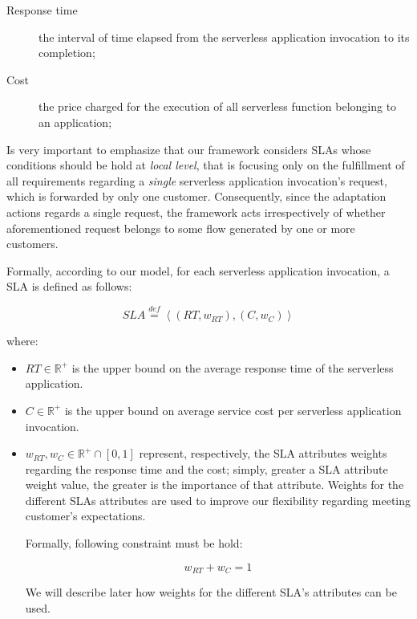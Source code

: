 \documentclass[12pt,a4paper]{report}
\newcommand{\mathDef}{\overset{\textit{def}}{=}}
\newcommand{\Rplus}{\mathbb{R}^+}
\begin{document}
\begin{description}
	\item[Response time] the interval of time elapsed from the
	serverless application invocation to its completion;
	\item[Cost] the price charged for the execution of all serverless function belonging to an application;
\end{description}

Is very important to emphasize that our framework considers SLAs whose conditions should be hold at \textit{local level}, that is focusing only on the fulfillment of all requirements regarding a \textit{single} serverless application invocation's request, which is forwarded by only one customer. Consequently, since the adaptation actions regards a single request, the framework acts irrespectively of whether aforementioned request belongs to some flow generated by one or more customers.

Formally, according to our model, for each serverless application invocation, a SLA is defined as follows:

\begin{equation}
	SLA \mathDef \left\langle (RT,w_{RT}),(C,w_{C}) \right\rangle 
\end{equation}
   
where:

\begin{itemize}
	\item $RT \in \mathbb{R}^+$ is the upper bound on the average
	response time of the serverless application.
	
	\item $C \in \mathbb{R}^+$ is the upper bound on average service cost per serverless application invocation.
	
	\item $w_{RT}, w_{C} \in \Rplus \cap \left[ 0,1 \right]$ represent, respectively, the SLA attributes weights regarding the response time and the cost; simply, greater a SLA attribute weight value, the greater is the importance of that attribute. Weights for the different SLAs attributes are used to improve our flexibility regarding meeting customer's expectations. 
	
	Formally, following constraint must be hold:
	
	\begin{equation}
		w_{RT} + w_{C} = 1
	\end{equation}

	We will describe later how weights for the different SLA's attributes can be used.
\end{itemize}
\end{document}
